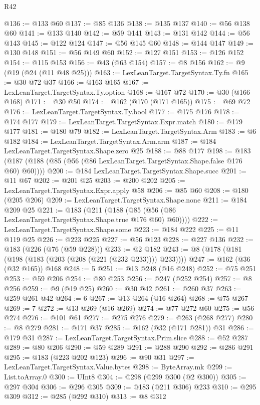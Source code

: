 \begin{lexlean}{R42}
\begin{coremodule}
@136 := @133 @60
@137 := @85 @136
@138 := @135 @137
@140 := @56 @138 @60
@141 := @133 @140
@142 := @59 @141
@143 := @131 @142
@144 := @56 @143
@145 := @122 @124
@147 := @56 @145 @60
@148 := @144 @147
@149 := @130 @148
@151 := @56 @149 @60
@152 := @127 @151
@153 := @126 @152
@154 := @115 @153
@156 := @43 (@63 @154)
@157 := @8 @156
@162 := @9 (@19 (@24 (@11 @48 @25)))
@163 := LexLeanTarget.TargetSyntax.Ty.fn
@165 := @30 @72 @37
@166 := @163 @165
@167 := LexLeanTarget.TargetSyntax.Ty.option
@168 := @167 @72
@170 := @30 (@166 @168)
@171 := @30 @50
@174 := @162 (@170 (@171 @165))
@175 := @69 @72
@176 := LexLeanTarget.TargetSyntax.Ty.bool
@177 := @175 @176
@178 := @174 @177
@179 := LexLeanTarget.TargetSyntax.Expr.match
@180 := @179 @177
@181 := @180 @79
@182 := LexLeanTarget.TargetSyntax.Arm
@183 := @6 @182
@184 := LexLeanTarget.TargetSyntax.Arm.arm
@187 := @184 LexLeanTarget.TargetSyntax.Shape.zero @25
@188 := @88 @177
@198 := @183 (@187 (@188 (@85 (@56 (@86 LexLeanTarget.TargetSyntax.Shape.false @176 @60) @60))))
@200 := @184 LexLeanTarget.TargetSyntax.Shape.succ
@201 := @11 @67
@202 := @201 @25
@203 := @200 @202
@205 := LexLeanTarget.TargetSyntax.Expr.apply @58
@206 := @85 @60
@208 := @180 (@205 @206)
@209 := LexLeanTarget.TargetSyntax.Shape.none
@211 := @184 @209 @25
@221 := @183 (@211 (@188 (@85 (@56 (@86 LexLeanTarget.TargetSyntax.Shape.true @176 @60) @60))))
@222 := LexLeanTarget.TargetSyntax.Shape.some
@223 := @184 @222
@225 := @11 @119 @25
@226 := @223 @225
@227 := @56 @123
@228 := @227 @136
@232 := @183 (@226 (@76 (@59 @228)))
@233 := @2 @182
@243 := @8 (@178 (@181 (@198 (@183 (@203 (@208 (@221 (@232 @233)))) @233))))
@247 := @162 (@36 (@32 @165)) @168
@248 := 5
@251 := @13 @248 (@16 @248)
@252 := @75 @251
@253 := @59 @206
@254 := @80 @253
@256 := @247 (@252 @254)
@257 := @8 @256
@259 := @9 (@19 @25)
@260 := @30 @42
@261 := @260 @37
@263 := @259 @261 @42
@264 := 6
@267 := @13 @264 (@16 @264)
@268 := @75 @267
@269 := 7
@272 := @13 @269 (@16 @269)
@274 := @77 @272 @60
@275 := @56 @274
@276 := @101 @61
@277 := @275 @276
@279 := @263 (@268 @277)
@280 := @8 @279
@281 := @171 @37
@285 := @162 (@32 (@171 @281)) @31
@286 := @179 @31
@287 := LexLeanTarget.TargetSyntax.Prim.slice
@288 := @52 @287
@289 := @80 @206
@290 := @59 @289
@291 := @288 @290
@292 := @286 @291
@295 := @183 (@223 @202 @123)
@296 := @90 @31
@297 := LexLeanTarget.TargetSyntax.Value.bytes
@298 := ByteArray.mk
@299 := List.toArray.{0}
@300 := UInt8
@304 := @298 (@299 @300 (@2 @300))
@305 := @297 @304
@306 := @296 @305
@309 := @183 (@211 @306) @233
@310 := @295 @309
@312 := @285 (@292 @310)
@313 := @8 @312

\end{coremodule}
\end{lexlean}
